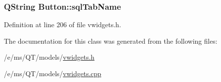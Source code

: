 \hypertarget{classButton_a3c40dd889e54499440ca3e90a392fe36}{
\subsubsection[{sqlTabName}]{\setlength{\rightskip}{0pt plus 5cm}QString {\bf Button::sqlTabName}}}
\label{classButton_a3c40dd889e54499440ca3e90a392fe36}


Definition at line 206 of file vwidgets.h.



The documentation for this class was generated from the following files:\begin{DoxyCompactItemize}
\item 
/e/ms/QT/models/\hyperlink{vwidgets_8h}{vwidgets.h}\item 
/e/ms/QT/models/\hyperlink{vwidgets_8cpp}{vwidgets.cpp}\end{DoxyCompactItemize}

